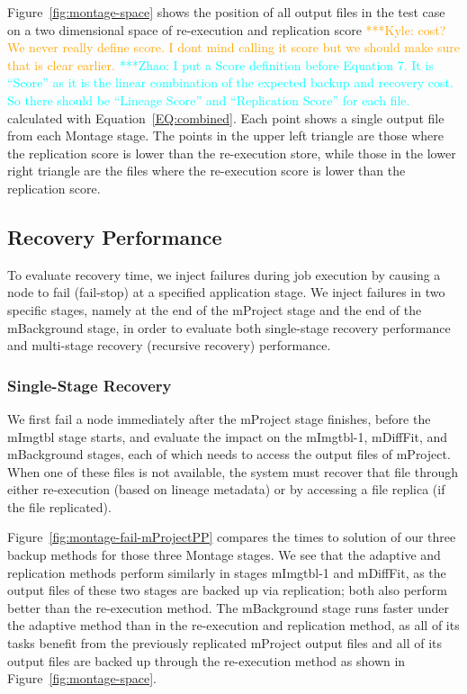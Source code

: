 \documentclass{sig-alternate}
\newcommand{\zhaonote}[1]{{\textcolor{cyan}    { ***Zhao:      #1 }}}
\newcommand{\kylenote}[1]{{\textcolor{orange}    { ***Kyle:      #1 }}}
\newcommand{\zhaonote}[1]{}
\newcommand{\kylenote}[1]{}
\begin{document}
Figure~\ref{fig:montage-space} shows the position of all output files in the test case on a two dimensional space of re-execution and replication score
\kylenote{cost? We never really define score. I dont mind calling it score but we should make sure that is clear earlier.} 
\zhaonote{I put a Score definition before Equation 7. It is ``Score'' as it is the linear combination of the expected backup and recovery cost. So there should be ``Lineage Score'' and ``Replication Score'' for each file.}
calculated with Equation~\ref{EQ:combined}.
Each point shows a single output file from each Montage stage. The points in the upper left triangle are those where the replication score is lower than the re-execution store, 
while those in the lower right triangle are the files where the re-execution score is lower than the replication score.

\subsection{Recovery Performance}
To evaluate recovery time, we inject failures during job execution by causing a node to fail (fail-stop) at a specified application stage.
We inject failures in two specific stages, namely at the end of the mProject stage and the end of the mBackground stage,
in order to evaluate both single-stage recovery performance and multi-stage recovery (recursive recovery) performance.

\subsubsection{Single-Stage Recovery}
We first fail a node immediately after the mProject stage finishes, before the mImgtbl stage starts,
and evaluate the impact on the mImgtbl-1, mDiffFit, and mBackground stages, each of which
needs to access the output files of mProject.
When one of these files is not available, the system must recover that file through either re-execution (based on
lineage metadata) or by accessing a file replica (if the file replicated).

Figure~\ref{fig:montage-fail-mProjectPP} compares the times to solution of our three backup methods for those three
Montage stages.
We see that the adaptive and replication methods perform similarly in stages mImgtbl-1 and mDiffFit,
as the output files of these two stages are backed up via replication; both also perform better than the re-execution method.
The mBackground stage runs faster under the adaptive method than in the re-execution and replication method,
as all of its tasks benefit from the previously replicated mProject output files and all of its output files are backed up through the re-execution method as shown in Figure~\ref{fig:montage-space}.
\end{document}
